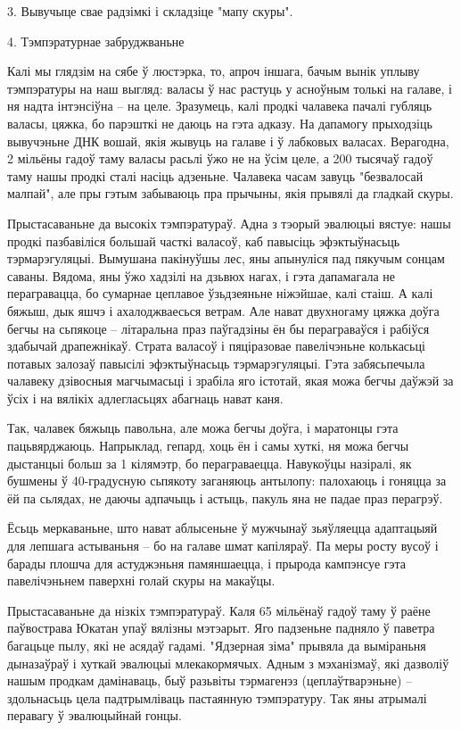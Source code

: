 3. Вывучыце свае радзімкі і складзіце "мапу скуры".


4. Тэмпэратурнае забруджваньне

Калі мы глядзім на сябе ў люстэрка, то, апроч іншага, бачым вынік уплыву тэмпэратуры на наш выгляд: валасы ў нас растуць у асноўным толькі на галаве, і ня надта інтэнсіўна – на целе. Зразумець, калі продкі чалавека пачалі губляць валасы, цяжка, бо парэшткі не даюць на гэта адказу. На дапамогу прыходзіць вывучэньне ДНК вошай, якія жывуць на галаве і ў лабковых валасах. Верагодна, 2 мільёны гадоў таму валасы расьлі ўжо не на ўсім целе, а 200 тысячаў гадоў таму нашы продкі сталі насіць адзеньне. Чалавека часам завуць "безвалосай малпай", але пры гэтым забываюць пра прычыны, якія прывялі да гладкай скуры.

Прыстасаваньне да высокіх тэмпэратураў. Адна з тэорый эвалюцыі вястуе: нашы продкі пазбавіліся большай часткі валасоў, каб павысіць эфэктыўнасьць тэрмарэгуляцыі. Вымушана пакінуўшы лес, яны апынуліся пад пякучым сонцам саваны. Вядома, яны ўжо хадзілі на дзьвюх нагах, і гэта дапамагала не перагравацца, бо сумарнае цеплавое ўзьдзеяньне ніжэйшае, калі стаіш. А калі бяжыш, дык яшчэ і ахалоджваесься ветрам. Але нават двухногаму цяжка доўга бегчы на сьпякоце – літаральна праз паўгадзіны ён бы пераграваўся і рабіўся здабычай драпежнікаў. Страта валасоў і пяціразовае павелічэньне колькасьці потавых залозаў павысілі эфэктыўнасьць тэрмарэгуляцыі. Гэта забясьпечыла чалавеку дзівосныя магчымасьці і зрабіла яго істотай, якая можа бегчы даўжэй за ўсіх і на вялікіх адлегласьцях абагнаць нават каня.

Так, чалавек бяжыць павольна, але можа бегчы доўга, і маратонцы гэта пацьвярджаюць. Напрыклад, гепард, хоць ён і самы хуткі, ня можа бегчы дыстанцыі больш за 1 кілямэтр, бо пераграваецца. Навукоўцы назіралі, як бушмены ў 40-градусную сьпякоту заганяюць антылопу: палохаюць і гоняцца за ёй па сьлядах, не даючы адпачыць і астыць, пакуль яна не падае праз перагрэў.

Ёсьць меркаваньне, што нават аблысеньне ў мужчынаў зьяўляецца адаптацыяй для лепшага астываньня – бо на галаве шмат капіляраў. Па меры росту вусоў і барады плошча для астуджэньня памяншаецца, і прырода кампэнсуе гэта павелічэньнем паверхні голай скуры на макаўцы.

Прыстасаваньне да нізкіх тэмпэратураў. Каля 65 мільёнаў гадоў таму ў раёне паўвострава Юкатан упаў вялізны мэтэарыт. Яго падзеньне падняло ў паветра багацьце пылу, які не асядаў гадамі. "Ядзерная зіма" прывяла да выміраньня дыназаўраў і хуткай эвалюцыі млекакормячых. Адным з мэханізмаў, які дазволіў нашым продкам дамінаваць, быў разьвіты тэрмагенэз (цеплаўтварэньне) – здольнасьць цела падтрымліваць пастаянную тэмпэратуру. Так яны атрымалі перавагу ў эвалюцыйнай гонцы.

